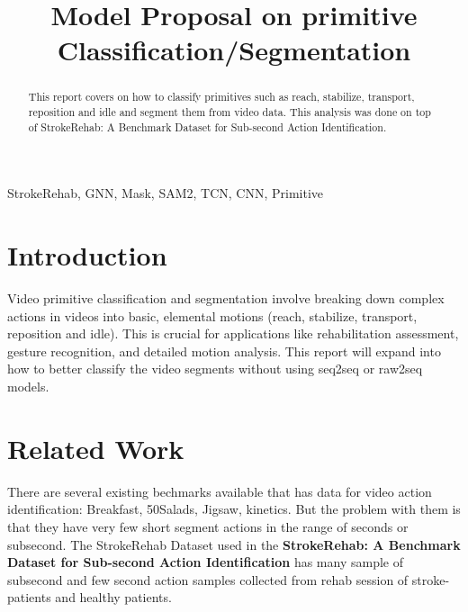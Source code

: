 \documentclass[conference]{IEEEtran}
\begin{document}
\title{Model Proposal on primitive Classification/Segmentation}

\author{
}

\maketitle

\begin{abstract}
    This report covers on how to classify primitives such as reach, stabilize, transport, reposition and idle and segment them from video data. This analysis was done on top of StrokeRehab: A Benchmark Dataset for Sub-second Action Identification.
\end{abstract}

\begin{IEEEkeywords}
    StrokeRehab, GNN, Mask, SAM2, TCN, CNN, Primitive
\end{IEEEkeywords}

\section{Introduction}
Video primitive classification and segmentation involve breaking down complex actions in videos into basic, elemental motions (reach, stabilize, transport, reposition and idle). This is crucial for applications like rehabilitation assessment, gesture recognition, and detailed motion analysis.
This report will expand into how to better classify the video segments without using seq2seq or raw2seq models.

\section{Related Work}
    There are several existing bechmarks available that has data for video action identification: Breakfast, 50Salads, Jigsaw, kinetics. But the problem with them is that they have very few short segment actions in the range of seconds or subsecond. The StrokeRehab Dataset used in the \textbf{StrokeRehab: A Benchmark Dataset for Sub-second Action Identification} has many sample of subsecond and few second action samples collected from rehab session of stroke-patients and healthy patients.
\end{document}
